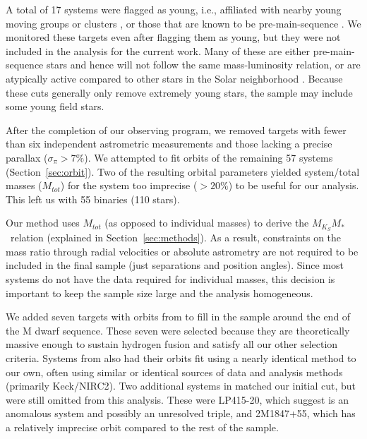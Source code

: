 \documentclass[twocolumn]{aastex62}
\newcommand{\mmk}{$M_{K_S}$\textendash$M_*$}
\begin{document}
A total of 17 systems were flagged as young, i.e., affiliated with nearby young moving groups or clusters \citep{Shkolnik2012, Kraus2014, Gagne2014, Malo2014a, Gagne2015, 2017AJ....153...95R, 2017AJ....154...69S, Rizzuto2017, 2018MNRAS.475.2955L}, or those that are known to be pre-main-sequence \citep[e.g., LP 349-25][]{2009ApJ...705.1416R}. We monitored these targets even after flagging them as young, but they were not included in the analysis for the current work. Many of these are either pre-main-sequence stars and hence will not follow the same mass-luminosity relation, or are atypically active compared to other stars in the Solar neighborhood \citep[e.g.,][]{Malo2014a}. Because these cuts generally only remove extremely young stars, the sample may include some young field stars. 

After the completion of our observing program, we removed targets with fewer than six independent astrometric measurements and those lacking a precise parallax ($\sigma_{\pi}>7\%$). We attempted to fit orbits of the remaining 57 systems (Section~\ref{sec:orbit}). Two of the resulting orbital parameters yielded system/total masses ($M_{tot}$) for the system too imprecise ($>20\%$) to be useful for our analysis. This left us with 55 binaries (110 stars).

Our method uses $M_{tot}$ (as opposed to individual masses) to derive the \mmk\ relation (explained in Section~\ref{sec:methods}). As a result, constraints on the mass ratio through radial velocities or absolute astrometry are not required to be included in the final sample (just separations and position angles). Since most systems do not have the data required for individual masses, this decision is important to keep the sample size large and the analysis homogeneous. 

We added seven targets with orbits from \citet{Dupuy2017} to fill in the sample around the end of the M dwarf sequence. These seven were selected because they are theoretically massive enough to sustain hydrogen fusion and satisfy all our other selection criteria. Systems from \citet{Dupuy2017} also had their orbits fit using a nearly identical method to our own, often using similar or identical sources of data and analysis methods (primarily Keck/NIRC2). Two additional systems in \citet{Dupuy2017} matched our initial cut, but were still omitted from this analysis. These were LP415-20, which \citet{Dupuy2017} suggest is an anomalous system and possibly an unresolved triple, and 2M1847+55, which has a relatively imprecise orbit compared to the rest of the sample.
\end{document}
